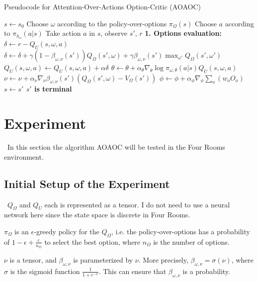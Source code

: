 \documentclass{article}
\begin{document}
	\begin{algorithm}[H]
	\caption{Pseudocode for Attention-Over-Actions Option-Critic (AOAOC)}
	\begin{algorithmic}
		\vspace{1.5mm}
		\State $s \leftarrow s_0$
		\State Choose $\omega$ according to the policy-over-options $\pi_\Omega(s)$
		\Repeat
		\State Choose $a$ according to $\pi_{h_\omega}(a|s)$
		\State Take action $a$ in $s$, observe $s'$, $r$\vspace{3mm}
		\State \bfseries{1. Options evaluation:}
		\State \normalfont $\delta \leftarrow r - Q_U(s,\omega,a)$
		\State $\delta \leftarrow \delta+\gamma(1-\beta_{\omega,\nu}(s'))Q_\Omega(s',\omega)+\gamma \beta_{\omega,\nu}(s')\max_{\omega'}Q_\Omega(s',\omega')$
		\EndIf
		\State $Q_U(s,\omega,a)\leftarrow Q_U(s,\omega,a) + \alpha \delta$
		\vspace{3mm}
		\State $\theta \leftarrow \theta + \alpha_\theta \nabla_\theta \log \pi_{\omega, \theta}(a|s)Q_U(s,\omega,a)$
		\State $\nu \leftarrow \nu + \alpha_\nu \nabla_\nu \beta_{\omega,\nu}(s')(Q_\Omega(s',\omega)-V_\Omega(s'))$
		\State \normalfont $\phi \leftarrow \phi + \alpha_\phi \nabla_\phi \sum_{o} (w_o O_o)$
		\EndIf
		\State $s \leftarrow s'$
		\Until $s'$ is terminal	
	\end{algorithmic}
	\end{algorithm}
	\section{Experiment}
	\qquad \ In this section the algorithm AOAOC will be tested in the Four Rooms environment.
	\subsection*{Initial Setup of the Experiment}
	\qquad \ $Q_\Omega$ and $Q_U$ each is represented as a tensor. I do not need to use a neural network here since the state space is discrete in Four Rooms.
	
	\quad $\pi_\Omega$ is an $\epsilon$-greedy policy for the $Q_\Omega$, i.e. the policy-over-options has a probability of $1-\epsilon+\frac{\epsilon}{n_\Omega}$ to select the best option, where $n_\Omega$ is the number of options.
	
	\quad $\nu$ is a tensor, and $\beta_{\omega, \nu}$ is parameterized by $\nu$. More precisely, $\beta_{\omega, \nu} = \sigma(\nu)$, where $\sigma$ is the sigmoid function $\frac{1}{1+e^{-x}}$. This can ensure that $\beta_{\omega, \nu}$ is a probability.
	
\end{document}
